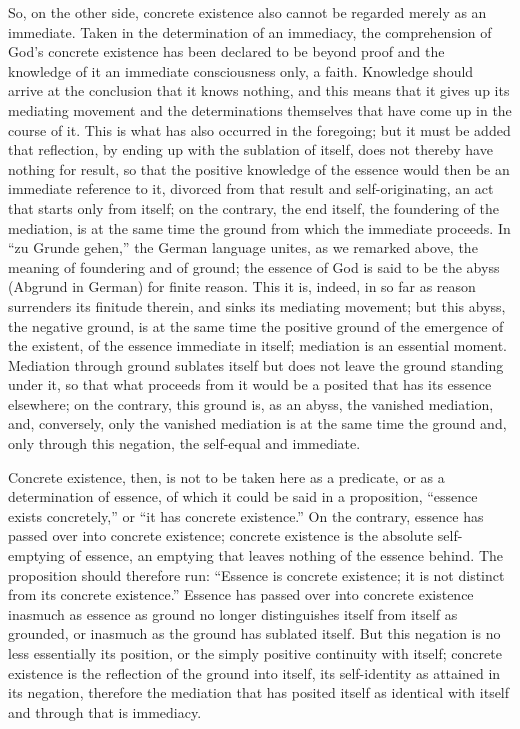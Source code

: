 So, on the other side, concrete existence also
cannot be regarded merely as an immediate.
Taken in the determination of an immediacy,
the comprehension of God's concrete existence
has been declared to be beyond proof
and the knowledge of it 
an immediate consciousness only, a faith.
Knowledge should arrive at
the conclusion that it knows nothing,
and this means that it gives up its mediating movement
and the determinations themselves
that have come up in the course of it.
This is what has also occurred in the foregoing;
but it must be added that reflection,
by ending up with the sublation of itself,
does not thereby have nothing for result,
so that the positive knowledge of the essence
would then be an immediate reference to it,
divorced from that result and self-originating,
an act that starts only from itself;
on the contrary, the end itself, 
the foundering of the mediation,
is at the same time the ground
from which the immediate proceeds.
In “zu Grunde gehen,” the German language unites, 
as we remarked above,
the meaning of foundering and of ground;
the essence of God is said to be the
abyss (Abgrund in German) for finite reason.
This it is, indeed, in so far as
reason surrenders its finitude therein,
and sinks its mediating movement;
but this abyss, the negative ground, is at the same time
the positive ground of the emergence of the existent,
of the essence immediate in itself;
mediation is an essential moment.
Mediation through ground sublates itself but
does not leave the ground standing under it,
so that what proceeds from it would be a posited
that has its essence elsewhere;
on the contrary, this ground is, as an abyss,
the vanished mediation, and, conversely, only the
vanished mediation is at the same time the ground
and, only through this negation,
the self-equal and immediate.

Concrete existence, then, is not to be taken here
as a predicate, or as a determination of essence,
of which it could be said in a proposition,
“essence exists concretely,” or “it has concrete existence.”
On the contrary, essence has passed over into concrete existence;
concrete existence is the absolute self-emptying of essence,
an emptying that leaves nothing of the essence behind.
The proposition should therefore run:
“Essence is concrete existence;
it is not distinct from its concrete existence.”
Essence has passed over into concrete existence
inasmuch as essence as ground 
no longer distinguishes itself from itself as grounded,
or inasmuch as the ground has sublated itself.
But this negation is no less essentially its position,
or the simply positive continuity with itself;
concrete existence is the reflection of the ground into itself,
its self-identity as attained in its negation,
therefore the mediation that has posited itself
as identical with itself and through that is immediacy.

